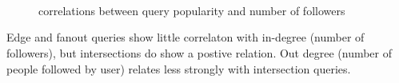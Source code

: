 \begin{figure}
\centering

   \\
  \\
  \\

\caption{correlations between query popularity and number of followers}
\label{fig:degworkload}

\end{figure}

Edge and fanout queries show little correlaton with in-degree (number of followers), but intersections do show a postive relation.  Out degree (number of people followed by user) relates less strongly with intersection queries.
